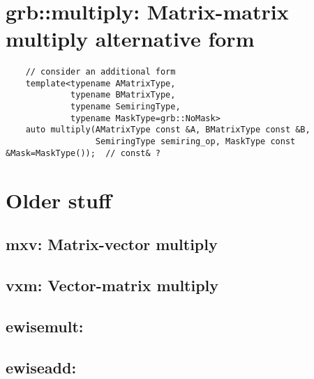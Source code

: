 \section{{\sf grb::multiply}: Matrix-matrix multiply alternative form}

\paragraph{\syntax}

\begin{verbatim}
    // consider an additional form
    template<typename AMatrixType,
             typename BMatrixType,
             typename SemiringType,
             typename MaskType=grb::NoMask>
    auto multiply(AMatrixType const &A, BMatrixType const &B,
                  SemiringType semiring_op, MaskType const &Mask=MaskType());  // const& ?
\end{verbatim}

\section{Older stuff}

\subsection{{\sf mxv}: Matrix-vector multiply}

\subsection{{\sf vxm}: Vector-matrix multiply}


\subsection{{\sf ewisemult}: }

\subsection{{\sf ewiseadd}: }

